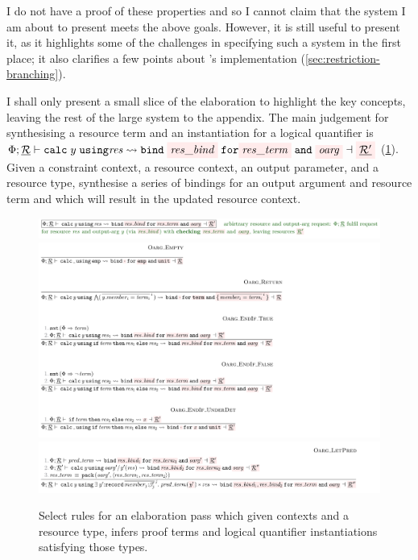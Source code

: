 I do not have a proof of these properties and so I cannot claim that the system
I am about to present meets the above goals. However, it is still useful to
present it, as it highlights some of the challenges in specifying such a system
in the first place; it also clarifies a few points about 's
implementation (\cref{sec:restriction-branching}).

I shall only present a small slice of the elaboration to highlight the key
concepts, leaving the rest of the large system to the appendix. The main
judgement for synthesising a resource term and an instantiation for a logical
quantifier is $\Phi; \underline{\mathcal{R}} \vdash \mathtt{calc}\; y \;
\mathtt{using} \mathit{res} \rightsquigarrow \mathtt{bind}\;
\outpol{res\_bind}\; \mathtt{for} \outpol{res\_term} \; \mathtt{and} \;
\outpol{oarg} \dashv \outpol{\underline{\mathcal{R}'}}$
(\cref{fig:elab-res-oarg}). Given a constraint context, a resource context, an
output parameter, and a resource type, synthesise a series of bindings for an
output argument and resource term and which will result in the updated resource
context.

\begin{figure}
    \includegraphics{figures/kernel-elab-calc-1}
    \includegraphics{figures/kernel-elab-calc-2}
    \includegraphics{figures/kernel-elab-calc-3}
    \caption{Select  rules for an elaboration pass which given
        contexts and a resource type, infers proof terms and logical quantifier
        instantiations satisfying those types.}\label{fig:elab-res-oarg}
\end{figure}

